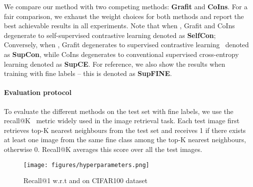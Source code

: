 \documentclass[10pt,twocolumn,letterpaper]{article}
\begin{document}
We compare our method with two competing methods: \textbf{Grafit} and \textbf{CoIns}. For a fair comparison, we exhaust the weight  choices for both methods and report the best achievable results in all experiments. Note that when , Grafit and CoIns degenerate to self-supervised contrastive learning denoted as \textbf{SelfCon}; Conversely, when , Grafit degenerates to supervised contrastive learning~\cite{supcon} denoted as \textbf{SupCon}, while CoIns degenerates to conventional supervised cross-entropy learning denoted as \textbf{SupCE}. 
For reference, we also show the results when training with fine labels -- this is denoted as \textbf{SupFINE}. 
\paragraph{Evaluation protocol}
To evaluate the different methods on the test set with fine labels, we use the recall@K~\cite{oh2016recallretrieval} metric widely used in the image retrieval task. Each test image first retrieves top-K nearest neighbours from the test set and receives 1 if there exists at least one image from the same fine class among the top-K nearest neighbours, otherwise 0. Recall@K averages this score over all the test images.
\begin{figure}[htbp]
    \centering
    \texttt{[image: figures/hyperparameters.png]}
    \caption{Recall@1 w.r.t  and  on CIFAR100 dataset}
    \label{fig:hyperparameters}
\end{figure}
\end{document}
